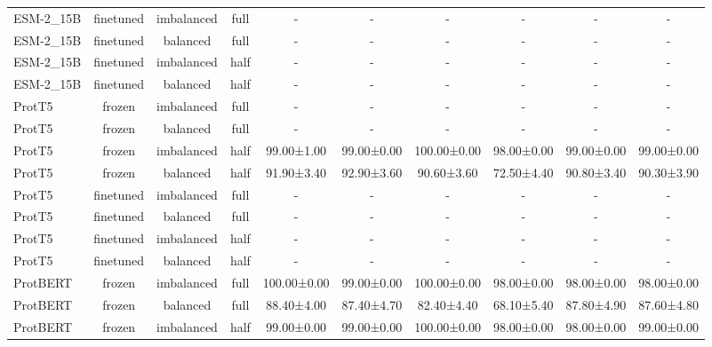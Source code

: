 \begin{tabular}{lccccccccc}
   ESM-2\_15B &      finetuned & imbalanced &      full &           - &           - &           - &           - &           - &           - \\
   ESM-2\_15B &      finetuned &   balanced &      full &           - &           - &           - &           - &           - &           - \\
   ESM-2\_15B &      finetuned & imbalanced &      half &           - &           - &           - &           - &           - &           - \\
   ESM-2\_15B &      finetuned &   balanced &      half &           - &           - &           - &           - &           - &           - \\
      ProtT5 &         frozen & imbalanced &      full &           - &           - &           - &           - &           - &           - \\
      ProtT5 &         frozen &   balanced &      full &           - &           - &           - &           - &           - &           - \\
      ProtT5 &         frozen & imbalanced &      half &  99.00±1.00 &  99.00±0.00 & 100.00±0.00 &  98.00±0.00 &  99.00±0.00 &  99.00±0.00 \\
      ProtT5 &         frozen &   balanced &      half &  91.90±3.40 &  92.90±3.60 &  90.60±3.60 &  72.50±4.40 &  90.80±3.40 &  90.30±3.90 \\
      ProtT5 &      finetuned & imbalanced &      full &           - &           - &           - &           - &           - &           - \\
      ProtT5 &      finetuned &   balanced &      full &           - &           - &           - &           - &           - &           - \\
      ProtT5 &      finetuned & imbalanced &      half &           - &           - &           - &           - &           - &           - \\
      ProtT5 &      finetuned &   balanced &      half &           - &           - &           - &           - &           - &           - \\
    ProtBERT &         frozen & imbalanced &      full & 100.00±0.00 &  99.00±0.00 & 100.00±0.00 &  98.00±0.00 &  98.00±0.00 &  98.00±0.00 \\
    ProtBERT &         frozen &   balanced &      full &  88.40±4.00 &  87.40±4.70 &  82.40±4.40 &  68.10±5.40 &  87.80±4.90 &  87.60±4.80 \\
    ProtBERT &         frozen & imbalanced &      half &  99.00±0.00 &  99.00±0.00 & 100.00±0.00 &  98.00±0.00 &  98.00±0.00 &  99.00±0.00 \\

\end{tabular}
